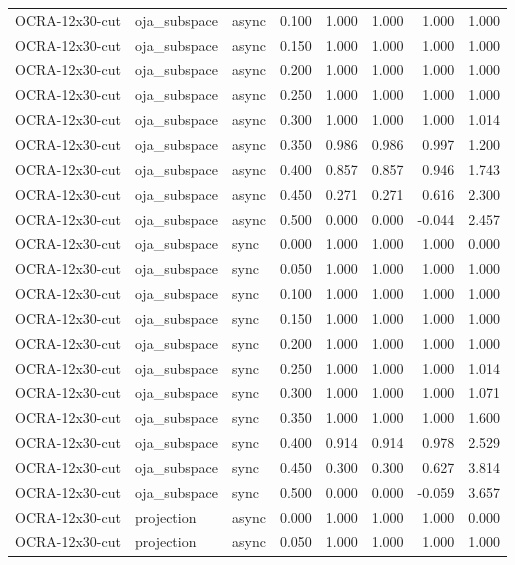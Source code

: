 \begin{tabular}{lllrrrrr}
OCRA-12x30-cut & oja\_subspace & async & 0.100 & 1.000 & 1.000 & 1.000 & 1.000 \\
OCRA-12x30-cut & oja\_subspace & async & 0.150 & 1.000 & 1.000 & 1.000 & 1.000 \\
OCRA-12x30-cut & oja\_subspace & async & 0.200 & 1.000 & 1.000 & 1.000 & 1.000 \\
OCRA-12x30-cut & oja\_subspace & async & 0.250 & 1.000 & 1.000 & 1.000 & 1.000 \\
OCRA-12x30-cut & oja\_subspace & async & 0.300 & 1.000 & 1.000 & 1.000 & 1.014 \\
OCRA-12x30-cut & oja\_subspace & async & 0.350 & 0.986 & 0.986 & 0.997 & 1.200 \\
OCRA-12x30-cut & oja\_subspace & async & 0.400 & 0.857 & 0.857 & 0.946 & 1.743 \\
OCRA-12x30-cut & oja\_subspace & async & 0.450 & 0.271 & 0.271 & 0.616 & 2.300 \\
OCRA-12x30-cut & oja\_subspace & async & 0.500 & 0.000 & 0.000 & -0.044 & 2.457 \\
OCRA-12x30-cut & oja\_subspace & sync & 0.000 & 1.000 & 1.000 & 1.000 & 0.000 \\
OCRA-12x30-cut & oja\_subspace & sync & 0.050 & 1.000 & 1.000 & 1.000 & 1.000 \\
OCRA-12x30-cut & oja\_subspace & sync & 0.100 & 1.000 & 1.000 & 1.000 & 1.000 \\
OCRA-12x30-cut & oja\_subspace & sync & 0.150 & 1.000 & 1.000 & 1.000 & 1.000 \\
OCRA-12x30-cut & oja\_subspace & sync & 0.200 & 1.000 & 1.000 & 1.000 & 1.000 \\
OCRA-12x30-cut & oja\_subspace & sync & 0.250 & 1.000 & 1.000 & 1.000 & 1.014 \\
OCRA-12x30-cut & oja\_subspace & sync & 0.300 & 1.000 & 1.000 & 1.000 & 1.071 \\
OCRA-12x30-cut & oja\_subspace & sync & 0.350 & 1.000 & 1.000 & 1.000 & 1.600 \\
OCRA-12x30-cut & oja\_subspace & sync & 0.400 & 0.914 & 0.914 & 0.978 & 2.529 \\
OCRA-12x30-cut & oja\_subspace & sync & 0.450 & 0.300 & 0.300 & 0.627 & 3.814 \\
OCRA-12x30-cut & oja\_subspace & sync & 0.500 & 0.000 & 0.000 & -0.059 & 3.657 \\
OCRA-12x30-cut & projection & async & 0.000 & 1.000 & 1.000 & 1.000 & 0.000 \\
OCRA-12x30-cut & projection & async & 0.050 & 1.000 & 1.000 & 1.000 & 1.000 \\

\end{tabular}
